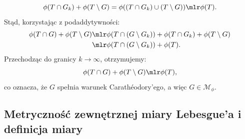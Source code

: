 \begin{dow}
    \begin{equation*}
        \phi(T \cap G_k) + \phi(T \setminus G) = \phi((T \cap G_k) \cup (T \setminus G)) \mlr \phi(T).
    \end{equation*}
    Stąd, korzystając z podaddytywności:
    \begin{align}
        \phi(T \cap G) + \phi(T \setminus G) & \mlr \phi(T \cap (G \setminus G_k)) + \phi(T \cap G_k) + \phi(T \setminus G) \\ &\mlr \phi(T \cap (G \setminus G_k)) + \phi(T).\end{align} Przechodząc do granicy $k \to \infty$, otrzymujemy:
    \begin{equation*}
        \phi(T \cap G) + \phi(T \setminus G) \mlr \phi(T),
    \end{equation*}
    co oznacza, że $G$ spełnia warunek Carathéodory'ego, a więc $G \in \mathcal{M}_\phi$.
\end{dow}

\subsection{Metryczność zewnętrznej miary Lebesgue'a i definicja miary}

